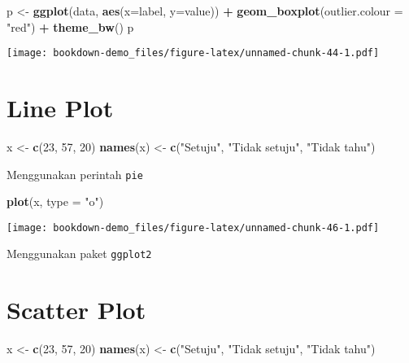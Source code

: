 \documentclass[
]{book}
\newenvironment{Shaded}{\begin{snugshade}}{\end{snugshade}}
\newcommand{\DataTypeTok}[1]{\textcolor[rgb]{0.13,0.29,0.53}{#1}}
\newcommand{\DecValTok}[1]{\textcolor[rgb]{0.00,0.00,0.81}{#1}}
\newcommand{\KeywordTok}[1]{\textcolor[rgb]{0.13,0.29,0.53}{\textbf{#1}}}
\newcommand{\NormalTok}[1]{#1}
\newcommand{\OperatorTok}[1]{\textcolor[rgb]{0.81,0.36,0.00}{\textbf{#1}}}
\newcommand{\StringTok}[1]{\textcolor[rgb]{0.31,0.60,0.02}{#1}}
\begin{document}
\begin{Shaded}
\begin{Highlighting}[]
\NormalTok{p <-}\StringTok{ }\KeywordTok{ggplot}\NormalTok{(data, }\KeywordTok{aes}\NormalTok{(}\DataTypeTok{x=}\NormalTok{label, }\DataTypeTok{y=}\NormalTok{value)) }\OperatorTok{+}
\StringTok{  }\KeywordTok{geom_boxplot}\NormalTok{(}\DataTypeTok{outlier.colour =} \StringTok{"red"}\NormalTok{) }\OperatorTok{+}
\StringTok{  }\KeywordTok{theme_bw}\NormalTok{()}
\NormalTok{p}
\end{Highlighting}
\end{Shaded}

\texttt{[image: bookdown-demo\_files/figure-latex/unnamed-chunk-44-1.pdf]}

\hypertarget{line-plot}{%
\section{Line Plot}\label{line-plot}}

\begin{Shaded}
\begin{Highlighting}[]
\NormalTok{x <-}\StringTok{ }\KeywordTok{c}\NormalTok{(}\DecValTok{23}\NormalTok{, }\DecValTok{57}\NormalTok{, }\DecValTok{20}\NormalTok{)}
\KeywordTok{names}\NormalTok{(x) <-}\StringTok{ }\KeywordTok{c}\NormalTok{(}\StringTok{"Setuju"}\NormalTok{, }\StringTok{"Tidak setuju"}\NormalTok{, }\StringTok{"Tidak tahu"}\NormalTok{)}
\end{Highlighting}
\end{Shaded}

Menggunakan perintah \texttt{pie}

\begin{Shaded}
\begin{Highlighting}[]
\KeywordTok{plot}\NormalTok{(x, }\DataTypeTok{type =} \StringTok{"o"}\NormalTok{)}
\end{Highlighting}
\end{Shaded}

\texttt{[image: bookdown-demo\_files/figure-latex/unnamed-chunk-46-1.pdf]}

Menggunakan paket \texttt{ggplot2}

\hypertarget{scatter-plot}{%
\section{Scatter Plot}\label{scatter-plot}}

\begin{Shaded}
\begin{Highlighting}[]
\NormalTok{x <-}\StringTok{ }\KeywordTok{c}\NormalTok{(}\DecValTok{23}\NormalTok{, }\DecValTok{57}\NormalTok{, }\DecValTok{20}\NormalTok{)}
\KeywordTok{names}\NormalTok{(x) <-}\StringTok{ }\KeywordTok{c}\NormalTok{(}\StringTok{"Setuju"}\NormalTok{, }\StringTok{"Tidak setuju"}\NormalTok{, }\StringTok{"Tidak tahu"}\NormalTok{)}
\end{Highlighting}
\end{Shaded}
\end{document}
